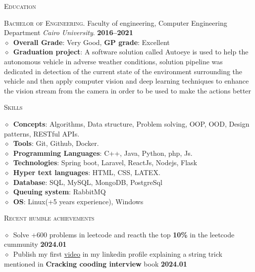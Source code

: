 \documentclass[11pt, a4paper]{article}
\newcommand{\dates}[1]{\hfill\mbox{\textbf{#1}}} %
\newcommand{\smaller}[1]{{\small$\diamond$\ #1}}
\newcommand{\headright}[1]{\vspace*{2.5ex}\textsc{\Large\color{secondColor}#1}\par%
     \vspace*{-2ex}{\color{secondColor}\hrulefill}\par}
\begin{document}
\begin{minipage}[t]{0.56\textwidth}
\headright{Education}
\textsc{Bachelor of Engineering.} Faculty of engineering, Computer Engineering Department \textit{Cairo University}.  \dates{2016--2021} \\
\smaller{\textbf{Overall Grade}: Very Good, \textbf{GP grade}: Excellent} \\
\smaller{\textbf{Graduation project}: A software solution called Autoeye is used to help the autonomous vehicle in adverse weather conditions, solution
pipeline was dedicated in detection of the current state of the environment surrounding the vehicle and then apply computer vision and
deep learning techniques to enhance the vision stream from the camera in order to be used to make the actions better}

\headright{Skills}
\smaller{\textbf{Concepts}: Algorithms, Data structure, Problem solving, OOP, OOD, Design patterns, RESTful APIs.} \\
\smaller{\textbf{Tools}: Git, Github, Docker.} \\
\smaller{\textbf{Programming Languages}: C++, Java, Python, php, Js.} \\
\smaller{\textbf{Technologies}: Spring boot, Laravel, ReactJs, Nodejs, Flask} \\
\smaller{\textbf{Hyper text languages}: HTML, CSS, LATEX.} \\ 
\smaller{\textbf{Database}: SQL, MySQL, MongoDB, PostgreSql} \\
\smaller{\textbf{Queuing system}: RabbitMQ} \\
\smaller{\textbf{OS}: Linux(+5 years experience), Windows}

\headright{Recent humble achievements}
\smaller{Solve +600 problems in leetcode and reacth the top \textbf{10\%} in the leetcode cummunity} \dates{2024.01} \\
\smaller{Publish my first \href{https://www.linkedin.com/posts/sofyanmahmoud0000_the-difference-between-str-str-activity-7151649201855045634-XyjD?utm_source=share&utm_medium=member_desktop}{video} in my linkedin profile explaining a string trick mentioned in \textbf{Cracking cooding interview} book} \dates{2024.01} \\

\end{minipage}
\end{document}
